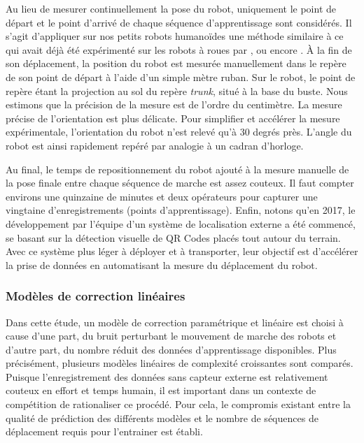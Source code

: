 Au lieu de mesurer continuellement la pose du robot, uniquement le point de départ 
et le point d'arrivé de chaque séquence d'apprentissage sont considérés.
Il s'agit d'appliquer sur nos petits robots humanoïdes une méthode similaire à 
ce qui avait déjà été expérimenté sur les robots à roues par \cite{kelly_fast_2004}, 
\cite{antonelli_calibration_2005} ou encore \cite{ivanjko_simple_2007}. 
À la fin de son déplacement, la position du robot est mesurée manuellement dans le
repère de son point de départ à l'aide d'un simple mètre ruban.
Sur le robot, le point de repère étant la projection au sol du repère 
\textit{trunk}, situé à la base du buste.
Nous estimons que la précision de la mesure est de l'ordre du centimètre.
La mesure précise de l'orientation est plus délicate.
Pour simplifier et accélérer la mesure expérimentale, l'orientation du robot n'est relevé
qu'à $30$ degrés près. L'angle du robot est ainsi rapidement repéré par analogie 
à un cadran d'horloge.

Au final, le temps de repositionnement du robot ajouté à la mesure manuelle de la pose finale
entre chaque séquence de marche est assez couteux.
Il faut compter environs une quinzaine de minutes et deux opérateurs 
pour capturer une vingtaine d'enregistrements (points d'apprentissage).
Enfin, notons qu'en 2017, le développement par l'équipe d'un système de localisation 
externe a été commencé, se basant sur la détection visuelle de QR Codes placés tout autour du terrain.
Avec ce système plus léger à déployer et à transporter, leur objectif est d'accélérer la prise de données 
en automatisant la mesure du déplacement du robot.

\subsubsection{Modèles de correction linéaires}

Dans cette étude, un modèle de correction paramétrique et linéaire est choisi
à cause d'une part, du bruit perturbant le mouvement de marche des robots
et d'autre part, du nombre réduit des données d'apprentissage disponibles.
Plus précisément, plusieurs modèles linéaires de complexité croissantes sont
comparés. 
Puisque l'enregistrement des données sans capteur externe est 
relativement couteux en effort et temps humain, il est important dans un contexte
de compétition de rationaliser ce procédé.
Pour cela, le compromis existant entre la qualité de prédiction des différents modèles
et le nombre de séquences de déplacement requis pour l'entrainer est établi.

